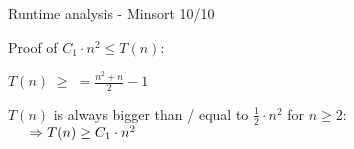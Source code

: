 \begin{frame}{Runtime analysis - Minsort 10/10}
  \begin{block}{Proof of $C_1 \cdot n^2 \leq T(n)$:}
    \vspace*{0.5em}
    \begin{center}
      $\displaystyle
        T(n) \; \geq \;
          = \frac{n^2 + n}{2} - 1
      $\\
    \end{center}
    $T(n)$ is always bigger than / equal to $\frac{1}{2} \cdot n^2$
    for $n \geq 2$:\\[1.0em]
    $\hspace*{1.5em}\Rightarrow T(n) \geq C_1 \cdot n^2$
  \end{block}
\end{frame}